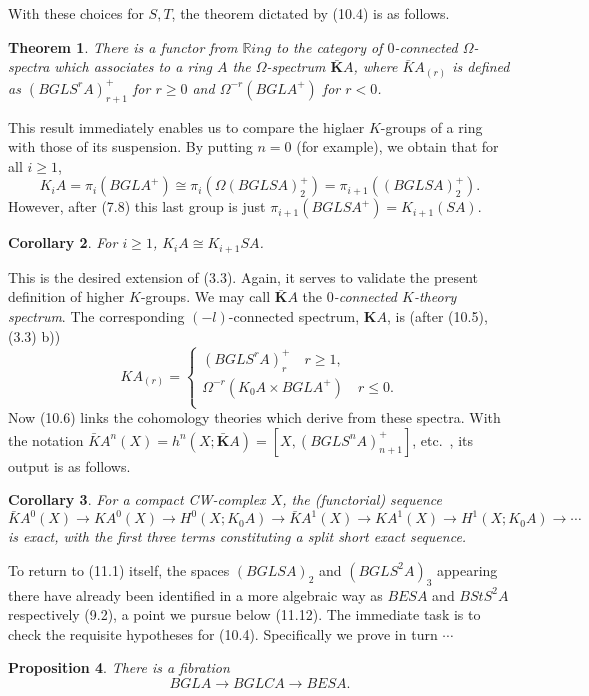 \documentclass[openany,leqno]{book}  %
\newtheorem{theorem}{Theorem}[chapter]
\newtheorem{prop}[theorem]{Proposition}
\newtheorem{corollary}[theorem]{Corollary}
\begin{document}
With these choices for $S, T$, the theorem dictated by (10.4) is as follows.
\begin{theorem}
There is a functor from $\mathbb{R}ing$ to the category of $0$-connected $\Omega$-spectra which associates to a ring $A$ the $\Omega$-spectrum $\bar{\mathbf{K}}A$, where $\bar{K}A_{(r)}$ is defined as $(BGLS^rA)_{r+1}^+$ for $r\geqslant 0$ and $\Omega^{-r}(BGLA^+)$ for $r<0$.
\end{theorem}
This result immediately enables us to compare the higlaer $K$-groups of a ring with those of its suspension. By putting $n = 0$ (for example), we obtain that for all $i \geqslant 1$,
\[K_iA = \pi_i(BGLA^+) \cong \pi_i(\Omega(BGLSA)^+_2) = \pi_{i+1}((BGLSA)^+_2).\]
However, after (7.8) this last group is just $\pi_{i+1}(BGLSA^+) =K_{i+1}(SA)$.
\begin{corollary}
  For $i\geqslant  1$, $K_iA\cong K_{i+1}SA$.
\end{corollary}
This is the desired extension of (3.3). Again, it serves to validate the present definition of higher $K$-groups. We may call $\bar{\mathbf{K}}A$ the {\em $0$-connected $K$-theory spectrum}. The corresponding $(-l)$-connected spectrum, $\mathbf{K}A$, is (after (10.5), (3.3) b))
\[KA_{(r)}=
\begin{cases}
  (BGLS^rA)_r^+  \quad r\geqslant  1 ,\\
\Omega^{-r}(K_0A \times BGLA^+)\quad r\leqslant0 .\\
\end{cases}\]
Now (10.6) links the cohomology theories which derive from these spectra. With the notation $\bar{K}A^n(X) = h^n(X; \bar{\mathbf{K}}A) = [X, (BGLS^nA)^+_{n+1} ]$, etc.\ , its output is as follows.
\begin{corollary}
  For a compact CW-complex $X$, the (functorial) sequence
\[\bar{K}A^0(X)\longrightarrow KA^0(X) \longrightarrow H^0(X; K_0A) \longrightarrow \bar{K}A^1 (X)\longrightarrow KA^1 (X) \longrightarrow H^1 (X; K_0A) \longrightarrow \cdots\]
is exact, with the first three terms constituting a split short exact sequence.
\end{corollary}
To return to (11.1) itself, the spaces $(BGLSA)_2$ and $(BGLS^2A)_3$ appearing there have already been identified in a more algebraic way as $BESA$ and $BStS^2 A$ respectively (9.2), a point we pursue below (11.12). The immediate task is to check the requisite hypotheses for (10.4). Specifically we prove in turn $\cdots $

\begin{prop}\label{11.4}
 	There is a fibration 
\[BGLA \longrightarrow BGLCA \longrightarrow BESA.\]
 \end{prop} 
\end{document}

